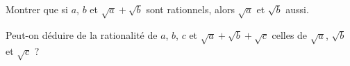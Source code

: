 Montrer que si $a$, $b$ et $\sqrt{a} + \sqrt{b}$ sont rationnels, alors $\sqrt{a}$ et $\sqrt{b}$ aussi.

Peut-on déduire de la rationalité de $a$, $b$, $c$ et $\sqrt{a} + \sqrt{b} + \sqrt{c}$ celles de $\sqrt{a}$, $\sqrt{b}$ et $\sqrt{c}$ ?
